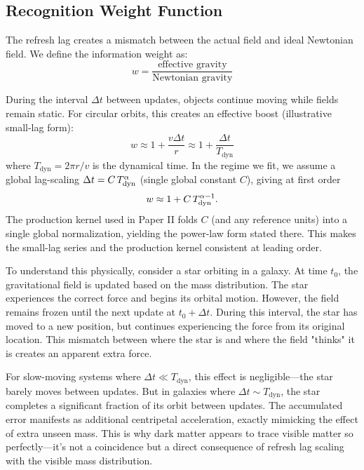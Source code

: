 \documentclass[usenatbib]{mnras}
\begin{document}
\subsection{Recognition Weight Function}

The refresh lag creates a mismatch between the actual field and ideal Newtonian field. We define the information weight as:
\begin{equation}
w = \frac{\text{effective gravity}}{\text{Newtonian gravity}}
\end{equation}

During the interval $\Delta t$ between updates, objects continue moving while fields remain static. For circular orbits, this creates an effective boost (illustrative small-lag form):
\begin{equation}
w \approx 1 + \frac{v \Delta t}{r} \approx 1 + \frac{\Delta t}{T_{\text{dyn}}}
\end{equation}
where $T_{\text{dyn}} = 2\pi r/v$ is the dynamical time. In the regime we fit, we assume a global lag-scaling $\Delta t = C\,T_{\rm dyn}^{\alpha}$ (single global constant $C$), giving at first order
\begin{equation}
w \approx 1 + C\, T_{\rm dyn}^{\alpha-1}.
\end{equation}
The production kernel used in Paper II folds $C$ (and any reference units) into a single global normalization, yielding the power-law form stated there. This makes the small-lag series and the production kernel consistent at leading order.

To understand this physically, consider a star orbiting in a galaxy. At time $t_0$, the gravitational field is updated based on the mass distribution. The star experiences the correct force and begins its orbital motion. However, the field remains frozen until the next update at $t_0 + \Delta t$. During this interval, the star has moved to a new position, but continues experiencing the force from its original location. This mismatch between where the star is and where the field "thinks" it is creates an apparent extra force.

For slow-moving systems where $\Delta t \ll T_{\text{dyn}}$, this effect is negligible---the star barely moves between updates. But in galaxies where $\Delta t \sim T_{\text{dyn}}$, the star completes a significant fraction of its orbit between updates. The accumulated error manifests as additional centripetal acceleration, exactly mimicking the effect of extra unseen mass. This is why dark matter appears to trace visible matter so perfectly---it's not a coincidence but a direct consequence of refresh lag scaling with the visible mass distribution.
\end{document}
